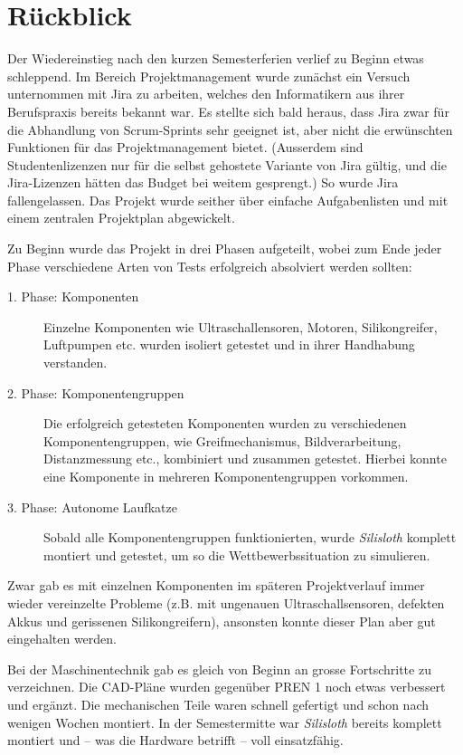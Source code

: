 \section{Rückblick}
\label{sec:schlusswort}

Der Wiedereinstieg nach den kurzen Semesterferien verlief zu Beginn etwas schleppend. Im Bereich Projektmanagement wurde zunächst ein Versuch unternommen mit Jira zu arbeiten, welches den Informatikern aus ihrer Berufspraxis bereits bekannt war. Es stellte sich bald heraus, dass Jira zwar für die Abhandlung von Scrum-Sprints sehr geeignet ist, aber nicht die erwünschten Funktionen für das Projektmanagement bietet. (Ausserdem sind Studentenlizenzen nur für die selbst gehostete Variante von Jira gültig, und die Jira-Lizenzen hätten das Budget bei weitem gesprengt.) So wurde Jira fallengelassen. Das Projekt wurde seither über einfache Aufgabenlisten und mit einem zentralen Projektplan abgewickelt.

Zu Beginn wurde das Projekt in drei Phasen aufgeteilt, wobei zum Ende jeder Phase verschiedene Arten von Tests erfolgreich absolviert werden sollten:

\begin{description}
    \item[1. Phase: Komponenten] Einzelne Komponenten wie Ultraschallensoren, Motoren, Silikongreifer, Luftpumpen etc. wurden isoliert getestet und in ihrer Handhabung verstanden.
    \item[2. Phase: Komponentengruppen] Die erfolgreich getesteten Komponenten wurden zu verschiedenen Komponentengruppen, wie Greifmechanismus, Bildverarbeitung, Distanzmessung etc., kombiniert und zusammen getestet. Hierbei konnte eine Komponente in mehreren Komponentengruppen vorkommen.
    \item[3. Phase: Autonome Laufkatze] Sobald alle Komponentengruppen funktionierten, wurde \textit{Silisloth} komplett montiert und getestet, um so die Wettbewerbssituation zu simulieren.
\end{description}

Zwar gab es mit einzelnen Komponenten im späteren Projektverlauf immer wieder vereinzelte Probleme (z.B. mit ungenauen Ultraschallsensoren, defekten Akkus und gerissenen Silikongreifern), ansonsten konnte dieser Plan aber gut eingehalten werden.

Bei der Maschinentechnik gab es gleich von Beginn an grosse Fortschritte zu verzeichnen. Die CAD-Pläne wurden gegenüber PREN 1 noch etwas verbessert und ergänzt. Die mechanischen Teile waren schnell gefertigt und schon nach wenigen Wochen montiert. In der Semestermitte war \textit{Silisloth} bereits komplett montiert und -- was die Hardware betrifft -- voll einsatzfähig.

